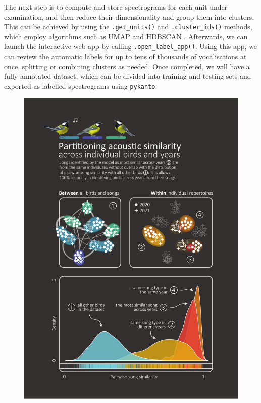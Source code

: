 The next step is to compute and store spectrograms for each unit under
examination, and then reduce their dimensionality and group them into clusters.
This can be achieved by using the \texttt{.get\_units()} and \texttt{.cluster\_ids()} methods, which
employ algorithms such as UMAP \parencite{mcinnes2018} and HDBSCAN
\parencite{mcinnes2017}. Afterwards, we can launch the interactive web app by
calling \texttt{.open\_label\_app()}. Using this app, we can review the automatic labels
for up to tens of thousands of vocalisations at once, splitting or combining
clusters as needed. Once completed, we will have a fully annotated dataset, which
can be divided into training and testing sets and exported as labelled
spectrograms using \texttt{pykanto}. 



\begin{figure}
    \centering
    \includegraphics[width=\linewidth]{figures/chapter_2/fig3.pdf}
    \label{c2_fig:results}
\end{figure}

